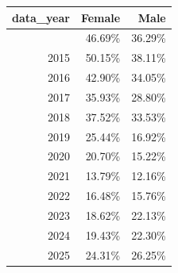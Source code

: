 \begin{table}[!t]


\fontsize{12.0pt}{14.4pt}\selectfont

\begin{tabular*}{\linewidth}{@{\extracolsep{\fill}}rrr}
\toprule
data\_year & Female & Male \\ 
\midrule\addlinespace[2.5pt]
2014 & 46.69\% & 36.29\% \\
2015 & 50.15\% & 38.11\% \\
2016 & 42.90\% & 34.05\% \\
2017 & 35.93\% & 28.80\% \\
2018 & 37.52\% & 33.53\% \\
2019 & 25.44\% & 16.92\% \\
2020 & 20.70\% & 15.22\% \\
2021 & 13.79\% & 12.16\% \\
2022 & 16.48\% & 15.76\% \\
2023 & 18.62\% & 22.13\% \\
2024 & 19.43\% & 22.30\% \\
2025 & 24.31\% & 26.25\% \\
\bottomrule
\end{tabular*}

\end{table}
